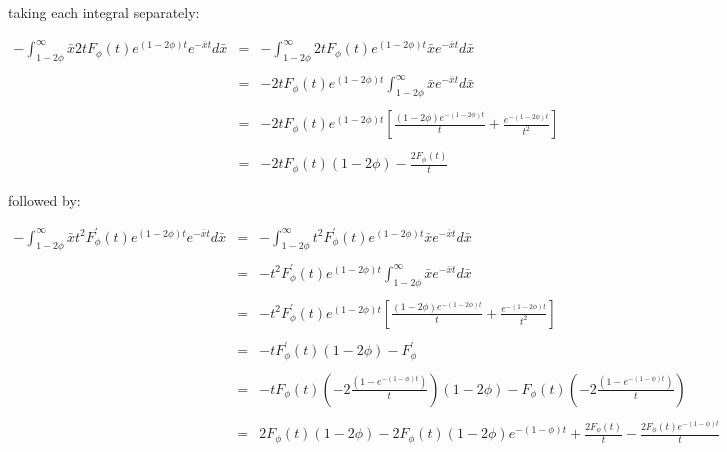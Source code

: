 taking each integral separately: \bigskip

\begin{eqnarray*}
	-\int_{1 - 2 \phi}^{\infty} \bar{x} 2 t F_{\phi}(t) e^{(1 - 2 \phi)t} e^{-\bar{x} t} d\bar{x} & = & -\int_{1 - 2 \phi}^{\infty} 2 t F_{\phi}(t) e^{(1 - 2 \phi)t} \bar{x} e^{-\bar{x} t} d\bar{x} \\\\
																								  & = & -2 t F_{\phi}(t) e^{(1 - 2 \phi)t} \int_{1 - 2 \phi}^{\infty} \bar{x} e^{-\bar{x} t} d\bar{x} \\\\
																								  & = & -2 t F_{\phi}(t) e^{(1 - 2 \phi)t} \left[ \frac{(1 - 2 \phi) e^{-(1 - 2 \phi)t}}{t} + \frac{e^{-(1 - 2 \phi)t}}{t^2} \right] \\\\
																								  & = & -2 t F_{\phi}(t) (1 - 2 \phi) - \frac{2 F_{\phi}(t)}{t}
\end{eqnarray*}\medskip

followed by: \bigskip

\begin{eqnarray*}
	-\int_{1 - 2 \phi}^{\infty} \bar{x} t^2 F_{\phi}^{\prime}(t) e^{(1 - 2 \phi)t} e^{-\bar{x} t} d\bar{x} & = & -\int_{1 - 2 \phi}^{\infty} t^2 F_{\phi}^{\prime}(t) e^{(1 - 2 \phi)t} \bar{x} e^{-\bar{x} t} d\bar{x} \\\\
																										   & = & -t^2 F_{\phi}^{\prime}(t) e^{(1 - 2 \phi)t} \int_{1 - 2 \phi}^{\infty} \bar{x} e^{-\bar{x} t} d\bar{x} \\\\
																										   & = & -t^2 F_{\phi}^{\prime}(t) e^{(1 - 2 \phi)t} \left[ \frac{(1 - 2 \phi) e^{-(1 - 2 \phi)t}}{t} + \frac{e^{-(1 - 2 \phi)t}}{t^2} \right] \\\\
																										   & = & -t F_{\phi}^{\prime}(t) (1 - 2 \phi) - F_{\phi}^{\prime} \\\\
																										   & = & -t F_{\phi}(t) \left( -2 \frac{(1 - e^{-(1 - \phi)t})}{t} \right) (1 - 2 \phi) - F_{\phi}(t) \left( -2 \frac{(1 - e^{-(1 - \phi)t})}{t} \right) \\\\
																										   & = & 2 F_{\phi}(t) (1 - 2 \phi) - 2 F_{\phi}(t) (1 - 2 \phi) e^{-(1 - \phi)t} + \frac{2 F_{\phi}(t)}{t} - \frac{2 F_{\phi}(t) e^{-(1 - \phi)t}}{t}
\end{eqnarray*}\medskip

